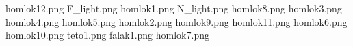 homlok12.png
F_light.png
homlok1.png
N_light.png
homlok8.png
homlok3.png
homlok4.png
homlok5.png
homlok2.png
homlok9.png
homlok11.png
homlok6.png
homlok10.png
teto1.png
falak1.png
homlok7.png
